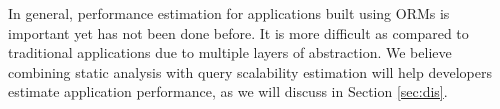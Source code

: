 
In general, performance estimation for applications built using ORMs is important yet has not been done before. It is more difficult as compared to traditional applications due to multiple layers of abstraction. 
We believe combining static analysis with query scalability estimation \cite{armbrust:sigmod13:scale, fan:pods2014:scale} will help developers estimate application performance, as we will discuss in Section \ref{sec:dis}. 

